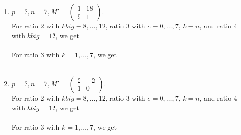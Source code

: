\documentclass[letterpaper,12pt]{article}
\begin{document}
\begin{enumerate}
\item $p=3, n=7, M' = \begin{pmatrix}
1 & 18 \\ 9 & 1
\end{pmatrix}.$ \\
For ratio 2 with $kbig = 8, \dots, 12$, ratio 3 with $e = 0, \dots, 7$, $k=n$, and ratio 4 with $kbig = 12$, we get \\
 \\
For ratio 3 with $k = 1, \dots, 7$, we get \\
 \\

\item $p=3, n=7, M' = \begin{pmatrix}
2 & -2 \\ 1 & 0
\end{pmatrix}.$ \\
For ratio 2 with $kbig = 8, \dots, 12$, ratio 3 with $e = 0, \dots, 7$, $k=n$, and ratio 4 with $kbig = 12$, we get \\
 \\
For ratio 3 with $k = 1, \dots, 7$, we get \\
 \\


\end{enumerate}
\end{document}
